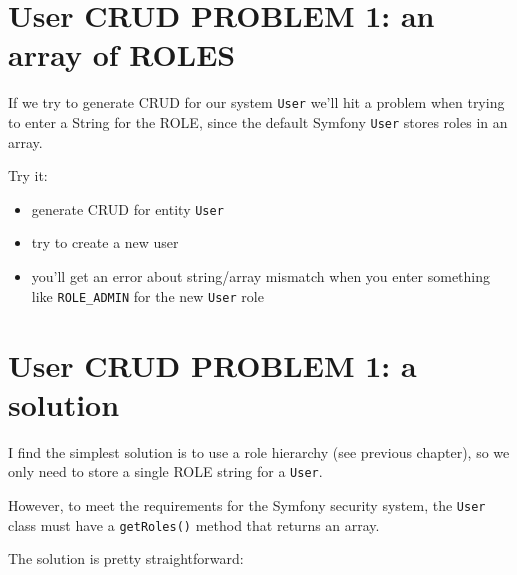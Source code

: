 \documentclass[a4paperpaper,openright]{book}
\providecommand{\tightlist}{%
  \setlength{\itemsep}{0pt}\setlength{\parskip}{0pt}}
\begin{document}
\hypertarget{user-crud-problem-1-an-array-of-roles}{%
\section{User CRUD PROBLEM 1: an array of
ROLES}\label{user-crud-problem-1-an-array-of-roles}}

If we try to generate CRUD for our system \texttt{User} we'll hit a
problem when trying to enter a String for the ROLE, since the default
Symfony \texttt{User} stores roles in an array.

Try it:

\begin{itemize}
\tightlist
\item
  generate CRUD for entity \texttt{User}
\item
  try to create a new user
\item
  you'll get an error about string/array mismatch when you enter
  something like \texttt{ROLE\_ADMIN} for the new \texttt{User} role
\end{itemize}

\hypertarget{user-crud-problem-1-a-solution}{%
\section{User CRUD PROBLEM 1: a
solution}\label{user-crud-problem-1-a-solution}}

I find the simplest solution is to use a role hierarchy (see previous
chapter), so we only need to store a single ROLE string for a
\texttt{User}.

However, to meet the requirements for the Symfony security system, the
\texttt{User} class must have a \texttt{getRoles()} method that returns
an array.

The solution is pretty straightforward:
\end{document}

